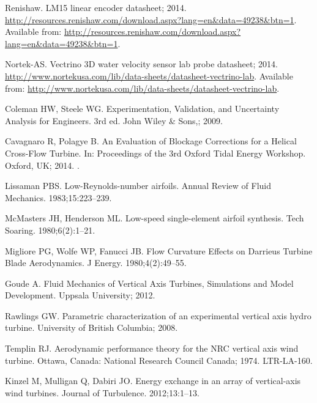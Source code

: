 \documentclass[10pt,letterpaper]{article}
\begin{document}
\begin{thebibliography}{10}
    Renishaw. {LM}15 linear encoder datasheet; 2014.
    \newblock
    \url{http://resources.renishaw.com/download.aspx?lang=en&data=49238&btn=1}.
    \newblock Available from:
    \url{http://resources.renishaw.com/download.aspx?lang=en&data=49238&btn=1}.

    Nortek-{AS}. Vectrino 3{D} water velocity sensor lab probe datasheet; 2014.
    \newblock
    \url{http://www.nortekusa.com/lib/data-sheets/datasheet-vectrino-lab}.
    \newblock Available from:
    \url{http://www.nortekusa.com/lib/data-sheets/datasheet-vectrino-lab}.

    Coleman HW, Steele WG.
    \newblock Experimentation, Validation, and Uncertainty Analysis for Engineers.
    \newblock 3rd ed. John Wiley \& Sons,; 2009.

    Cavagnaro R, Polagye B.
    \newblock An Evaluation of Blockage Corrections for a Helical Cross-Flow
    Turbine.
    \newblock In: Proceedings of the 3rd Oxford Tidal Energy Workshop. Oxford, UK;
    2014. .

    Lissaman PBS.
    \newblock Low-{R}eynolds-number airfoils.
    \newblock Annual Review of Fluid Mechanics. 1983;15:223--239.

    McMasters JH, Henderson ML.
    \newblock Low-speed single-element airfoil synthesis.
    \newblock Tech Soaring. 1980;6(2):1--21.

    Migliore PG, Wolfe WP, Fanucci JB.
    \newblock Flow Curvature Effects on {D}arrieus Turbine Blade Aerodynamics.
    \newblock J Energy. 1980;4(2):49--55.

    Goude A.
    \newblock Fluid Mechanics of Vertical Axis Turbines, Simulations and Model
    Development.
    \newblock Uppsala University; 2012.

    Rawlings GW.
    \newblock Parametric characterization of an experimental vertical axis hydro
    turbine.
    \newblock University of British Columbia; 2008.

    Templin RJ.
    \newblock Aerodynamic performance theory for the NRC vertical axis wind
    turbine.
    \newblock Ottawa, Canada: National Research Council Canada; 1974. LTR-LA-160.

    Kinzel M, Mulligan Q, Dabiri JO.
    \newblock Energy exchange in an array of vertical-axis wind turbines.
    \newblock Journal of Turbulence. 2012;13:1--13.

\end{thebibliography}
\end{document}
